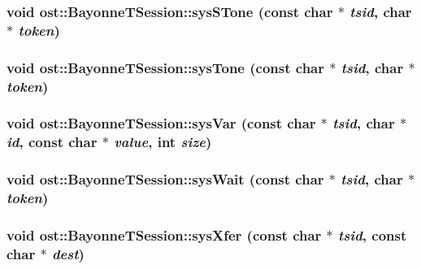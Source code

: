 \subsubsection[{sysSTone}]{\setlength{\rightskip}{0pt plus 5cm}void ost::BayonneTSession::sysSTone (const char $\ast$ {\em tsid}, \/  char $\ast$ {\em token})\hspace{0.3cm}{\ttfamily  [protected]}}\label{classost_1_1_bayonne_t_session_a8c6cc8771bc00f36e4f92e281d246414}
\subsubsection[{sysTone}]{\setlength{\rightskip}{0pt plus 5cm}void ost::BayonneTSession::sysTone (const char $\ast$ {\em tsid}, \/  char $\ast$ {\em token})\hspace{0.3cm}{\ttfamily  [protected]}}\label{classost_1_1_bayonne_t_session_ac5c75afe9451b860b086e66eba0c4da2}
\subsubsection[{sysVar}]{\setlength{\rightskip}{0pt plus 5cm}void ost::BayonneTSession::sysVar (const char $\ast$ {\em tsid}, \/  char $\ast$ {\em id}, \/  const char $\ast$ {\em value}, \/  int {\em size})\hspace{0.3cm}{\ttfamily  [protected]}}\label{classost_1_1_bayonne_t_session_a468bb6a0e918112adbccc7c526469e8f}
\subsubsection[{sysWait}]{\setlength{\rightskip}{0pt plus 5cm}void ost::BayonneTSession::sysWait (const char $\ast$ {\em tsid}, \/  char $\ast$ {\em token})\hspace{0.3cm}{\ttfamily  [protected]}}\label{classost_1_1_bayonne_t_session_aebd6cd6ef5f212a08a6a03b7702f0e53}
\subsubsection[{sysXfer}]{\setlength{\rightskip}{0pt plus 5cm}void ost::BayonneTSession::sysXfer (const char $\ast$ {\em tsid}, \/  const char $\ast$ {\em dest})\hspace{0.3cm}{\ttfamily  [protected]}}\label{classost_1_1_bayonne_t_session_ad8bb22816030b269df5e4ab9273cc85a}


